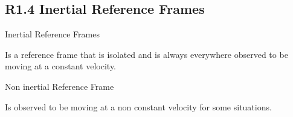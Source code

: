 \documentclass[twocolumn]{report}
\begin{document}
\subsection{R1.4 Inertial Reference Frames}

Inertial Reference Frames

Is a reference frame that is isolated and is always everywhere observed to be moving at a constant velocity.

Non inertial Reference Frame

Is observed to be moving at a non constant velocity for some situations. 



\end{document}
